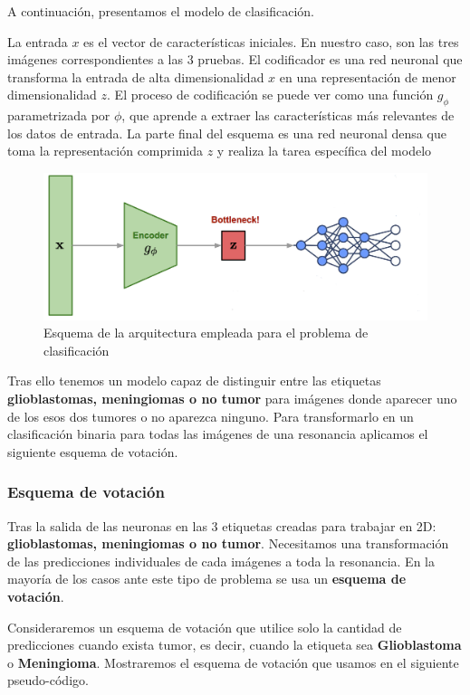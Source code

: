 A continuación, presentamos el modelo de clasificación.

La entrada $x$ es el vector de características iniciales. En nuestro caso, son las tres imágenes correspondientes a las $3$ pruebas. El codificador es una red neuronal que transforma la entrada de alta dimensionalidad $x$ en una representación de menor dimensionalidad $z$. El proceso de codificación se puede ver como una función $g_{\phi}$ parametrizada por $\phi$, que aprende a extraer las características más relevantes de los datos de entrada. La parte final del esquema es una red neuronal densa que toma la representación comprimida $z$ y realiza la tarea específica del modelo

\begin{figure}[H]
	\centering
	\includegraphics[width=0.9\linewidth]{imagenes/esquema_clasificacion.png}
	\caption{Esquema de la arquitectura empleada para el problema de clasificación}
\end{figure}

Tras ello tenemos un modelo capaz de distinguir entre las etiquetas \textbf{glioblastomas, meningiomas o no tumor} para imágenes donde aparecer uno de los esos dos tumores o no aparezca ninguno. Para transformarlo en un clasificación binaria para todas las imágenes de una resonancia aplicamos el siguiente esquema de votación.

\subsubsection{Esquema de votación}

Tras la salida de las neuronas en las $3$ etiquetas creadas para trabajar en 2D: \textbf{glioblastomas, meningiomas o no tumor}. Necesitamos una transformación de las predicciones individuales de cada imágenes a toda la resonancia. En la mayoría de los casos ante este tipo de problema se usa un \textbf{esquema de votación}.

Consideraremos un esquema de votación que utilice solo la cantidad de predicciones cuando exista tumor, es decir, cuando la etiqueta sea \textbf{Glioblastoma} o \textbf{Meningioma}. Mostraremos el esquema de votación que usamos en el siguiente pseudo-código.

